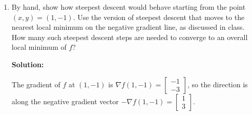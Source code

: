 \documentclass[conference,onecolumn]{IEEEtran}
\begin{document}
\begin{enumerate}
\begin{enumerate}
\begin{align*}
\begin{cases}
\begin{bmatrix}
                                          0 & 6
                                    \end{bmatrix}, det(H_f(\frac{4}{3}, 0)) > 0   \Rightarrow H_f(\frac{4}{3}, 0) \text{ positive definite} \\
                                    H_f(\frac{4}{3}, -2) & = \begin{bmatrix}
                                          4 & 0  \\
                                          0 & -6
                                    \end{bmatrix}, det(H_f(\frac{4}{3}, -2)) < 0 \Rightarrow H_f(\frac{4}{3}, -2) \text{ indefinite}
                              \end{cases}
                        \end{align*}
                        So we can determine the type of critical points
                        \begin{align*}
                              \begin{cases}
                                    (0, 0)            & \text{ saddle point}  \\
                                    (0, -2)           & \text{ local maximum} \\
                                    (\frac{4}{3}, 0)  & \text{ local minimum} \\
                                    (\frac{4}{3}, -2) & \text{ saddle point}
                              \end{cases}
                        \end{align*}

                  \item By hand, show how steepest descent would behave starting from the point $(x, y) = (1, -1)$.
                        Use the version of steepest descent that moves to the nearest local minimum on the negative gradient line, as discussed in class.
                        How many such steepest descent steps are needed to converge to an overall local minimum of $f$?

                        \textbf{Solution:}

                        The gradient of $f$ at $(1, -1)$ is $\nabla f(1, -1) = \begin{bmatrix} -1 \\ -3 \end{bmatrix}$, so the direction is along the negative gradient vector $-\nabla f(1, -1) = \begin{bmatrix}1 \\ 3\end{bmatrix}$.


\end{enumerate}
\end{enumerate}
\end{document}
